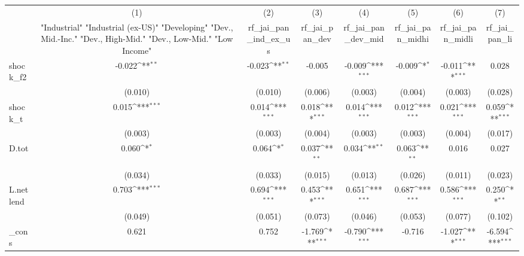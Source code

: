 {
\def\sym#1{\ifmmode^{#1}\else\(^{#1}\)\fi}
\begin{tabular}{l*{7}{c}}
\toprule
            &\multicolumn{1}{c}{(1)}&\multicolumn{1}{c}{(2)}&\multicolumn{1}{c}{(3)}&\multicolumn{1}{c}{(4)}&\multicolumn{1}{c}{(5)}&\multicolumn{1}{c}{(6)}&\multicolumn{1}{c}{(7)}\\
            &\multicolumn{1}{c}{ "Industrial" "Industrial (ex-US)" "Developing" "Dev., Mid.-Inc." "Dev., High-Mid."  "Dev., Low-Mid." "Low Income" }&\multicolumn{1}{c}{rf\_jai\_pan\_ind\_ex\_us}&\multicolumn{1}{c}{rf\_jai\_pan\_dev}&\multicolumn{1}{c}{rf\_jai\_pan\_dev\_mid}&\multicolumn{1}{c}{rf\_jai\_pan\_midhi}&\multicolumn{1}{c}{rf\_jai\_pan\_midli}&\multicolumn{1}{c}{rf\_jai\_pan\_li}\\
\midrule
shock\_f2    &      -0.022\sym{**} &      -0.023\sym{**} &      -0.005         &      -0.009\sym{***}&      -0.009\sym{*}  &      -0.011\sym{***}&       0.028         \\
            &     (0.010)         &     (0.010)         &     (0.006)         &     (0.003)         &     (0.004)         &     (0.003)         &     (0.028)         \\
\addlinespace
shock\_t     &       0.015\sym{***}&       0.014\sym{***}&       0.018\sym{***}&       0.014\sym{***}&       0.012\sym{***}&       0.021\sym{***}&       0.059\sym{***}\\
            &     (0.003)         &     (0.003)         &     (0.004)         &     (0.003)         &     (0.003)         &     (0.004)         &     (0.017)         \\
\addlinespace
D.tot       &       0.060\sym{*}  &       0.064\sym{*}  &       0.037\sym{**} &       0.034\sym{**} &       0.063\sym{**} &       0.016         &       0.027         \\
            &     (0.034)         &     (0.033)         &     (0.015)         &     (0.013)         &     (0.026)         &     (0.011)         &     (0.023)         \\
\addlinespace
L.netlend   &       0.703\sym{***}&       0.694\sym{***}&       0.453\sym{***}&       0.651\sym{***}&       0.687\sym{***}&       0.586\sym{***}&       0.250\sym{**} \\
            &     (0.049)         &     (0.051)         &     (0.073)         &     (0.046)         &     (0.053)         &     (0.077)         &     (0.102)         \\
\addlinespace
\_cons      &       0.621         &       0.752         &      -1.769\sym{***}&      -0.790\sym{***}&      -0.716         &      -1.027\sym{***}&      -6.594\sym{***}\\

\end{tabular}}
